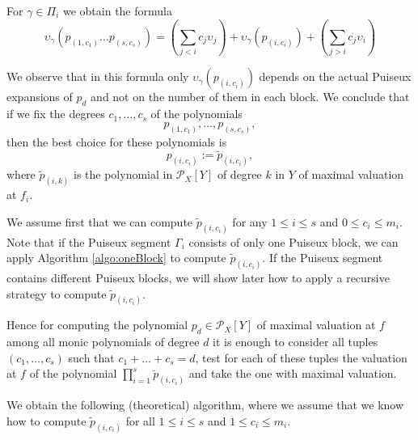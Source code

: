 \documentclass[a4paper,11pt]{amsart}%
\theoremstyle{definition}
\theoremstyle{plain}
\theoremstyle{remark}
\begin{document}
For $\gamma \in \Pi_i$ we obtain the formula
\[
\boxed{
\upsilon_{\gamma}(p_{(1, c_1)} \dots p_{(s, c_s)}) = \left(\textstyle \sum_{j < i} c_j \upsilon_j\right) + \upsilon_{\gamma}(p_{(i,c_i)}) + \left(\textstyle  \sum_{j > i} c_j \upsilon_i \right)}
\]


We observe that in this formula only $\upsilon_{\gamma}(p_{(i,c_i)})$ depends on the actual Puiseux expansions of $p_d$ and not on the number of them in each block. We conclude that if we fix the degrees $c_1, \dots, c_s$ of the polynomials
$$p_{(1, c_1)}, \dots, p_{(s, c_s)},$$
 then the best choice for these polynomials is $$p_{(i, c_i)} := \tilde p_{(i, c_i)},$$
where $\tilde p_{(i, k)}$ is the polynomial in $\mathcal{P}_{X}[Y]$ of degree $k$ in $Y$ of maximal valuation at $f_i$.

We assume first that we can compute $\tilde p_{(i, c_i)}$ for any $1 \le i \le s$ and $0 \le c_i \le m_i$. Note that if the Puiseux segment $\Gamma_i$ consists of only one Puiseux block, we can apply Algorithm \ref{algo:oneBlock} to compute $\tilde p_{(i, c_i)}$.
If the Puiseux segment contains different Puiseux blocks, we will show later how to apply a recursive strategy to compute $\tilde p_{(i, c_i)}$.


Hence for computing the polynomial $p_d \in {\mathcal{P}_{X}}[Y]$ of maximal valuation at $f$ among all monic polynomials of degree $d$ it is enough to consider all tuples $(c_1, \dots, c_s)$ such that $c_1 + \dots + c_s = d$, test for each of these tuples the valuation at $f$ of the polynomial $\prod_{i=1}^s \tilde p_{(i, c_i)}$ and take the one with maximal valuation.

We obtain the following (theoretical) algorithm, where we assume that we know how to compute $\tilde p_{(i,c_i)}$ for all $1 \le i \le s$ and $1 \le c_i \le m_i$.
\end{document}
